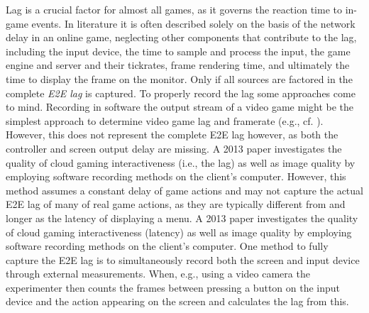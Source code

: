 Lag is a crucial factor for almost all games, as it governs the reaction time to in-game events. In literature it is often described solely on the basis of the network delay in an online game, neglecting other components that contribute to the lag, including the input device, the time to sample and process the input, the game engine and server and their tickrates, frame rendering time, and ultimately the time to display the frame on the monitor. Only if all sources are factored in the complete \textit{\gls{E2E} lag} is captured. To properly record the lag some approaches come to mind. Recording in software the output stream of a video game might be the simplest approach to determine video game lag and framerate (e.g., cf. \cite{Chen:2011:MLC:2072298.2071991}). However, this does not represent the complete \gls{E2E} lag however, as both the controller and screen output delay are missing. A 2013 paper \cite{6574660} investigates the quality of cloud gaming interactiveness (i.e., the lag) as well as image quality by employing software recording methods on the client's computer. However, this method assumes a constant delay of game actions and may not capture the actual \gls{E2E} lag of many of real game actions, as they are typically different from and longer as the latency of displaying a menu. A 2013 paper \cite{6574660} investigates the quality of cloud gaming interactiveness (latency) as well as image quality by employing software recording methods on the client's computer. One method to fully capture the \gls{E2E} lag is to simultaneously record both the screen and input device through external measurements. When, e.g., using a video camera the experimenter then counts the frames between pressing a button on the input device and the action appearing on the screen and calculates the lag from this.


